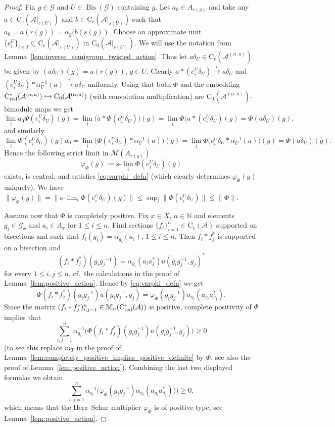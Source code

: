 \documentclass[11 pt, leqno]{amsart}
\numberwithin{equation}{section}
\theoremstyle{plain}
\theoremstyle{definition}
\newcommand{\Mat}{\mathbb M} %
\newcommand*{\contc}{\mathrm{C_c}}%
\newcommand*{\contz}{\mathrm{C_0}}%
\DeclareMathOperator{\red}{red}%
\DeclareMathOperator{\Bis}{Bis}
\newcommand{\M}{\mathcal M}
\newcommand{\G}{\mathcal G} %
\newcommand{\A}{\mathcal A}
\newcommand{\N}{\mathbb N}
\newcommand{\cst}{\ifmmode\mathrm{C}^*\else{$\mathrm{C}^*$}\fi}
\begin{document}
\begin{proof}
Fix $g\in \G$ and $U\in \Bis(\G)$ containing $g$. 
Let $a_0 \in A_{r(g)}$ and take any $a \in \contc(\A|_{r(U)})$ and $b\in \contc(\A|_{s(U)})$ such that $a_0 = a(r(g)) = \alpha_g(b(s(g))$. 
Choose an approximate unit $\{e_i^{U}\}_{i \in I} \subseteq \contc(\A|_{r(U)})$ in  $\contz(\A|_{r(U)})$.
We will use the notation from Lemma~\ref{lem:inverse_semigroup_twisted_action}. 
Thus let $a\delta_U\in \contc(\A^{(\alpha,u)})$ be given by $(a\delta_U)(g) =  a(r(g))$, $g\in U$. 
Clearly $a *(e_i^{U}\delta_{U}) \stackrel{i}{\to} a\delta_{U}$ and  $(e_i^{U}\delta_{U})*\alpha_{U}^{-1}(a) \stackrel{i}{\to} a\delta_{U}$ uniformly.   
Using that both $\Phi$ and the embedding $\cst_{\red}(\A^{(\alpha,u)}) \hookrightarrow \contz(\A^{(\alpha,u)})$ (with convolution multiplication) are $\contz(\A^{(\alpha,u)})$-bimodule maps we get
\[
    \lim_{i} a_0\Phi(e_i^{U}\delta_{U})(g) = \lim_{i} \big( a *\Phi(e_i^{U}\delta_{U}) \big)(g) = \lim_{i} \Phi(a *(e_i^{U}\delta_{U})(g) = \Phi(a\delta_{U})(g) , 
\]
and similarly 
\[
    \lim_{i} \Phi(e_i^{U}\delta_{U})(g) a_0 = \lim_{i} \big(\Phi(e_i^{U}\delta_{U})*  \alpha_{U}^{-1}(a) \big) (g) = \lim_{i} \Phi \big( e_i^{U}\delta_{U}*  \alpha_{U}^{-1}(a) \big) (g) = \Phi ( a\delta_{U} ) (g) .
\]
Hence 
the following strict limit in $\M(A_{r(g)})$
\[
    \varphi_{\Phi}(g) := \text{s-}\lim_{i} \Phi( e_i^{U}\delta_{U} ) (g)
\]
exists, is central, and satisfies \eqref{eq:varphi_defn} (which clearly determines $\varphi_{\Phi}(g)$ uniquely). 
We have $\| \varphi_{\Phi}(g) \| = \| \text{s-}\lim_{i} \Phi( e_i^{U}\delta_{U})(g) \| \leq \sup_{i} \| \Phi(e_i^{U}\delta_{U}) \| \leq \|\Phi\|$.

Assume now that $\Phi$ is completely positive. 
Fix $x \in X$, $n \in \N$ and elements $g_i \in \G_x$ and $a_{i} \in A_{x}$ for $1 \leq i \leq n$. 
Find sections $\{ f_i \}_{i = 1}^n \in \contc(\A)$ supported on bisections and such that $f_{i}(g_i) = \alpha_{g_i}(a_{i})$, $1 \leq i \leq n$. 
Then $f_i * f_j^*$ is supported on a bisection and 
\[
    (f_i * f_j^*)(g_i {g_j}^{-1}) = \alpha_{g_i}(a_{i} a_{j}^*)u(g_i g_j^{-1},g_j)^*
\]
for every $1 \leq i,j \leq n$, cf.\ the calculations in the proof of Lemma~\ref{lem:positive_action}. 
Hence by \eqref{eq:varphi_defn} we get
\[
    \Phi( f_{i} * f_j^*) (g_{i}g_{j}^{-1}) u(g_{i}g_{j}^{-1},g_{j}) = \varphi_{\Phi}(g_{i}g_{j}^{-1}) \alpha_{g_{i}}(a_{g_i} a_{g_j}^*) .  
\]
Since the matrix $(f_i * f_j^*)_{i,j = 1}^n\in \Mat_{n}(\cst_{\red}(\A))$ is positive, complete positivity of $\Phi$ implies that 
\[
	\sum_{i,j=1}^n \alpha^{-1}_{g_i} \Big( \Phi( f_{i} * f_j^*)(g_{i}g_{j}^{-1})u(g_{i}g_{j}^{-1},g_{j}) \Big) \geq 0
\]
(to see this replace $m_T$ in the proof of Lemma~\ref{lem:completely_positive_implies_positive_definite} by $\Phi$, see also the proof of Lemma~\ref{lem:positive_action}). 
Combining the last two displayed formulas we obtain
\[
	\sum_{i,j=1}^n \alpha^{-1}_{g_i} \Big( \varphi_{\Phi}(g_{i} g_{j}^{-1} ) \alpha_{g_{i}} ( a_{g_i} a_{g_j}^* ) ) \Big) \geq 0,
\]
which means that the Herz--Schur multiplier $\varphi_{\Phi}$ is of positive type, see Lemma~\ref{lem:positive_action}.
\end{proof}
\end{document}
